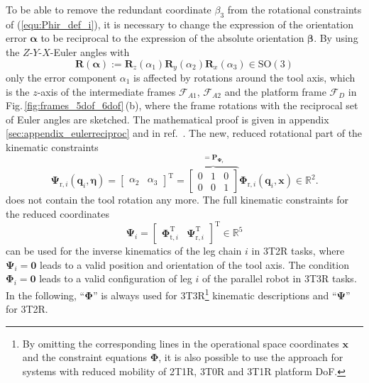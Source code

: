 \documentclass[robotics,article,submit,moreauthors,pdftex]{Definitions/mdpi}
\newcommand{\bm}[1]{\boldsymbol{#1}}
\newcommand{\transp}[0]{{\mathrm{T}}}
\newcommand{\ks}[1]{{\mathcal{F}}_{#1}}
\begin{document}
To be able to remove the redundant coordinate $\beta_3$ from the rotational constraints of (\ref{equ:Phir_def_i}), it is necessary to change the expression of the orientation error $\bm{\alpha}$ to be reciprocal to the expression of the absolute orientation $\bm{\beta}$.
By using the $Z$-$Y$-$X$-Euler angles with
%
\begin{equation}
\bm{R}(\bm{\alpha}) := \bm{R}_z(\alpha_1) \bm{R}_y(\alpha_2) \bm{R}_x(\alpha_3) \in \mathrm{SO(3)}
\label{equ:def_rmat_zyxr}
\end{equation}
%
only the error component $\alpha_1$ is affected by rotations around the tool axis, which is the $z$-axis of the intermediate frames $\ks{A1}$, $\ks{A2}$ and the platform frame $\ks{D}$ in Fig.\,\ref{fig:frames_5dof_6dof}\,(b), where the frame rotations with the reciprocal set of Euler angles are sketched.
The mathematical proof is given in appendix\,\ref{sec:appendix_eulerreciproc} and in ref.\, \cite{1_SchapplerTapOrt2019}.
%
The new, reduced rotational part of the kinematic constraints
%
\begin{equation}
\bm{\Psi}_{\mathrm{r},i}(\bm{q}_i,\bm{\eta}) = 
\begin{bmatrix}
\alpha_2  & \alpha_3
\end{bmatrix}^\transp
=
\overbrace{\begin{bmatrix}
    0 & 1 & 0  \\ 
    0 & 0 & 1
    \end{bmatrix}}^{=\bm{P}_{\bm{\Psi}_\mathrm{r}}}
\bm{\Phi}_{\mathrm{r},i} (\bm{q}_i,\bm{x})
\in {\mathbb{R}}^{2}.
\label{equ:Psir_def}
\end{equation}
%
does not contain the tool rotation any more.
The full kinematic constraints for the reduced coordinates
%
\begin{equation}
\bm{\Psi}_i=\begin{bmatrix}
\bm{\Phi}_{\mathrm{t},i}^\transp & \bm{\Psi}_{\mathrm{r},i}^\transp
\end{bmatrix}^\transp \in {\mathbb{R}}^{5}
\label{equ:Psi_def}
\end{equation}
%
can be used for the inverse kinematics of the leg chain $i$ in 3T2R tasks, where $\bm{\Psi}_i=\bm{0}$ leads to a valid position and orientation of the tool axis.
The condition $\bm{\Phi}_i=\bm{0}$ leads to a valid configuration of leg $i$ of the parallel robot in 3T3R tasks.
In the following, ``$\bm{\Phi}$'' is always used for 3T3R\footnote{By omitting the corresponding lines in the operational space coordinates $\bm{x}$ and the constraint equations $\bm{\Phi}$, it is also possible to use the approach for systems with reduced mobility of 2T1R, 3T0R and 3T1R platform DoF.} kinematic descriptions and ``$\bm{\Psi}$'' for 3T2R.
\end{document}
